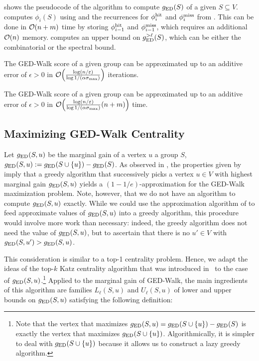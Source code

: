  shows the pseudocode of the algorithm to compute
$g_{\text{ED}}(S)$ of a given $S \subseteq V$.
 computes $\phi_i(S)$ using
 and the recurrences for $\phi^{\text{hit}}_i$ and $\phi^{\text{miss}}_i$
from .
%
This can be done in $\mathcal{O}(n + m)$ time by storing $\phi^{\text{hit}}_{i - 1}$ and $\phi^{\text{miss}}_{i
- 1}$, which requires an additional $\mathcal{O}(n)$ memory.
 computes an upper bound on $g_{\text{ED}}^{>\ell}(S)$,
which can be either the combinatorial or the spectral bound.

\begin{lemma}
\label{lemma:ged-walk:ged-score-approx}
The GED-Walk score of a given group can be approximated up to an additive error
of $\epsilon > 0$ in $\Oh\roundb{\frac{\log(n /
\epsilon)}{\log 1/(\alpha\sigma_{\max})}}$ iterations.
\end{lemma}

\begin{corollary}
The GED-Walk score of a given group can be approximated up to an additive
error of $\epsilon > 0$ in
$\Oh\roundb{\frac{\log(n / \epsilon)}{\log 1/(\alpha\sigma_{\max})} (n + m)}$
time.
\end{corollary}

\subsection{Maximizing GED-Walk Centrality}
\label{sec:ged-walk:maximizing-ged}

Let $g_{\text{ED}}(S, u)$ be the marginal gain of a vertex $u$ \wrt a group $S$, \ie
$\ged(S, u) := \ged(S\cup\set{u}) - \ged(S)$. As observed in
, the properties given by
 imply that a greedy algorithm that successively
picks a vertex $u \in V$ with highest marginal gain $g_{\text{ED}}(S, u)$ yields a $(1 -
1/e)$-approximation for the GED-Walk maximization problem.
Note, however, that we do not have an algorithm to compute $g_{\text{ED}}(S, u)$ exactly.
While we could use the approximation algorithm of 
to feed approximate values of $g_{\text{ED}}(S, u)$ into a greedy algorithm, this
procedure would involve more work than necessary:
indeed, the greedy algorithm does not need the value of $g_{\text{ED}}(S, u)$, but
to ascertain that there is no $u'\in V$ with $g_{\text{ED}}(S, u') > g_{\text{ED}}(S, u)$.

This consideration is similar to a top-1 centrality problem. Hence, we adapt
the ideas of the top-$k$ Katz centrality algorithm that was introduced
in~\cite{DBLP:conf/esa/GrintenBGBM18} to the case of
$g_{\text{ED}}(S, u)$.\footnote{Note that the vertex that maximizes
$\ged(S, u) = \ged(S \cup \set{u}) - \ged(S)$ is exactly the vertex that
maximizes $\ged(S \cup \set{u})$. Algorithmically, it is simpler to
deal with $\ged(S \cup \set{u})$ because it allows us to construct
a lazy greedy algorithm.}
%
Applied to the marginal gain of GED-Walk, the main ingredients of this
algorithm are families $L_{\ell}(S, u)$ and $U_{\ell}(S, u)$ of lower and
upper bounds on $g_{\text{ED}}(S, u)$ satisfying the following definition:

